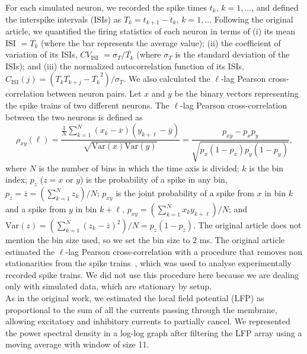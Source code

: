 For each simulated neuron, we recorded the spike times $t_k$, $k = 1, \ldots$, and defined the interspike intervals (ISIs) as $T_k = t_{k+1} - t_k$, $k=1, \ldots$ Following the original article, we quantified the firing statistics of each neuron in terms of (i) its mean ISI $= \overline{T_k}$ (where the bar represents the average value); (ii) the coefficient of variation of its ISIs, $CV_{\text{ISI}}$ $=\sigma_T/ \overline{T_k}$ (where $\sigma_T$ is the standard deviation of the ISIs); and (iii) the normalized autocorrelation function of its ISIs, $C_{\text{ISI}}(j) = \left( \overline{T_{k} T_{k+j}} - \overline{T_k}^2 \right)/\sigma_T$. We also calculated the $\ell$-lag Pearson cross-correlation between neuron pairs. Let $x$ and $y$ be the binary vectors representing the spike trains of two different neurons. The $\ell$-lag Pearson cross-correlation between the two neurons is defined as~\cite{lombard13met}
\begin{equation}\label{eq:pearsoncc}
    \rho_{xy}(\ell) = \frac{ \frac{1}{N} \sum_{k=1}^{N} (x_k - \overline{x})(y_{k+\ell} - \overline{y})}{\sqrt{\text{Var}(x) \text{Var}(y)}} = \frac{p_{xy} - p_x p_y}{\sqrt{p_x(1 - p_x)p_y(1 - p_y)}},
\end{equation}
\noindent where $N$ is the number of bins in which the time axis is divided; $k$ is the bin index; $p_z$ ($z=x$ or $y$) is the probability of a spike in any bin, $p_z = \overline{z} = \left( \sum_{k=1}^{N} z_k \right)/N$; $p_{xy}$ is the joint probability of a spike from $x$ in bin $k$ and a spike from $y$ in bin $k+\ell$, $p_{xy} = \left(\sum_{k=1}^{N} x_k y_{k+\ell}\right)/N$; and $\text{Var}(z) = \left( \sum_{k=1}^{N} \left(z_k - \overline{z} \right)^2 \right)/N = p_z (1 - p_z)$. The original article does not mention the bin size used, so we set the bin size to 2 ms. The original article estimated the $\ell$-lag Pearson cross-correlation with a procedure that removes non stationarities from the spike trains~\cite{lombard13met}, which was used to analyse experimentally recorded spike trains. We did not use this procedure here because we are dealing only with simulated data, which are stationary by setup. \\

As in the original work, we estimated the local field potential (LFP) as proportional to the sum of all the currents passing through the membrane, allowing excitatory and inhibitory currents to partially cancel. We represented the power spectral density in a log-log graph after filtering the LFP array using a moving average with window of size 11.\\

